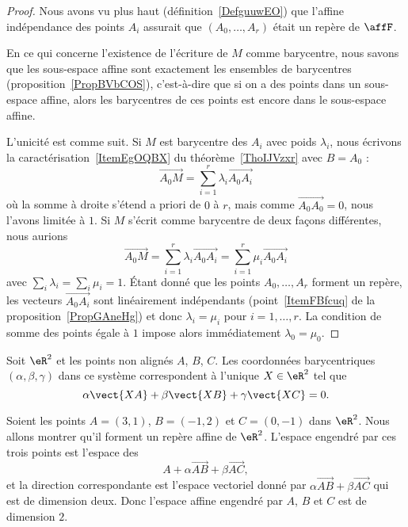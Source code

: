 \begin{proof}
    Nous avons vu plus haut (définition~\ref{DefguuwEO}) que l'affine indépendance des points \( A_i\) assurait que \( (A_0,\ldots, A_r)\) était un repère de \( \affF\).

    En ce qui concerne l'existence de l'écriture de \( M\) comme barycentre, nous savons que les sous-espace affine sont exactement les ensembles de barycentres (proposition~\ref{PropBVbCOS}), c'est-à-dire que si on a des points dans un sous-espace affine, alors les barycentres de ces points est encore dans le sous-espace affine.

    L'unicité est comme suit. Si \( M\) est barycentre des \( A_i\) avec poids \( \lambda_i\), nous écrivons la caractérisation~\ref{ItemEgOQBX} du théorème~\ref{ThoIJVzxr} avec \( B=A_0\) :
    \begin{equation}
        \overrightarrow{ A_0M }=\sum_{i=1}^r\lambda_i\overrightarrow{ A_0A_i }
    \end{equation}
    où la somme à droite s'étend a priori de \( 0\) à \( r\), mais comme \( \overrightarrow{ A_0A_0 }=0\), nous l'avons limitée à \( 1\). Si \( M\) s'écrit comme barycentre de deux façons différentes, nous aurions
    \begin{equation}
        \overrightarrow{ A_0M }=\sum_{i=1}^r\lambda_i\overrightarrow{ A_0A_i }=\sum_{i=1}^r\mu_i\overrightarrow{ A_0A_i }
    \end{equation}
    avec \( \sum_i\lambda_i=\sum_i\mu_i=1\). Étant donné que les points \( A_0,\ldots, A_r\) forment un repère, les vecteurs \( \overrightarrow{ A_0A_i }\) sont linéairement indépendants (point~\ref{ItemFBfcuq} de la proposition~\ref{PropGAneHg}) et donc \( \lambda_i=\mu_i\) pour \( i=1,\ldots, r\). La condition de somme des points égale à \( 1\) impose alors immédiatement \( \lambda_0=\mu_0\).
\end{proof}

\begin{normaltext}      \label{NORMooOGHBooMjmouu}
    Soit \( \eR^2\) et les points non alignés \( A\), \( B\), \( C\). Les coordonnées barycentriques \( (\alpha,\beta,\gamma)\) dans ce système correspondent à l'unique \( X\in \eR^2\) tel que
    \begin{equation}
        \alpha \vect{ XA }+\beta\vect{ XB }+\gamma\vect{ XC }=0.
    \end{equation}
\end{normaltext}

\begin{example}
    Soient les points \( A=(3,1)\), \( B=(-1,2)\) et \( C=(0,-1)\) dans \( \eR^2\). Nous allons montrer qu'il forment un repère affine de \( \eR^2\). L'espace engendré par ces trois points est l'espace des
    \begin{equation}
        A+\alpha\overrightarrow{ AB }+\beta\overrightarrow{ AC },
    \end{equation}
    et la direction correspondante est l'espace vectoriel donné par \( \alpha\overrightarrow{ AB }+\beta\overrightarrow{ AC }\) qui est de dimension deux. Donc l'espace affine engendré par \( A\), \( B\) et \( C\) est de dimension \( 2\).
\end{example}

